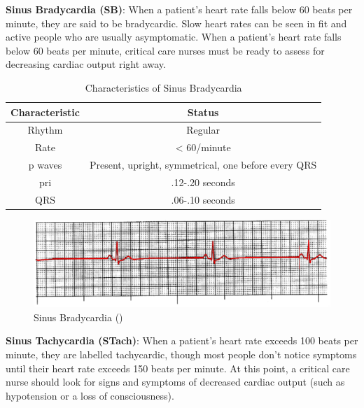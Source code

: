 \textbf{Sinus Bradycardia (SB)}: When a patient's heart rate falls below 60 beats per minute, they are said to be bradycardic. Slow heart rates can be seen in fit and active people who are usually asymptomatic. When a patient's heart rate falls below 60 beats per minute, critical care nurses must be ready to assess for decreasing cardiac output right away.

\begin{table}[H]
\begin{center}
\begin{tabular}{||c || c||}
 \hline
\textbf{Characteristic} & \textbf{Status} \\ [0.4ex] 
 \hline
 Rhythm & Regular \\
\hline\hline
Rate & < 60/minute \\
\hline
p waves & Present, upright, symmetrical, one before every QRS \\
\hline
pri & .12-.20 seconds \\
\hline
QRS & .06-.10 seconds \\
\hline\hline
\end{tabular}
\end{center}
\caption{Characteristics of Sinus Bradycardia}
\label{table:sb_characteristics}
\end{table}


 \begin{figure}[H]
\centering
\includegraphics[scale=0.85]{img/SB.png}
\caption{Sinus Bradycardia (\cite{arryth_types})}
\label{fig:sb}
\end{figure}

\textbf{Sinus Tachycardia (STach)}: When a patient's heart rate exceeds 100 beats per minute, they are labelled tachycardic, though most people don't notice symptoms until their heart rate exceeds 150 beats per minute. At this point, a critical care nurse should look for signs and symptoms of decreased cardiac output (such as hypotension or a loss of consciousness).

